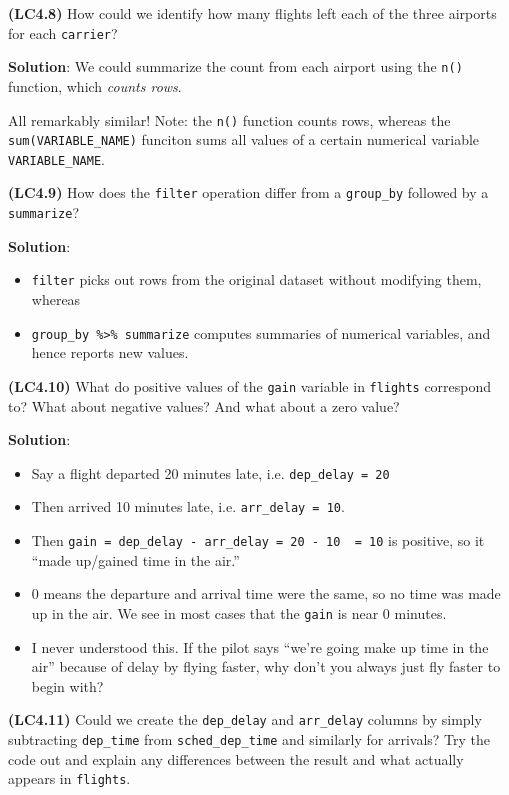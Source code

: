 \documentclass[12pt, krantz2,]{krantz}
\providecommand{\tightlist}{%
  \setlength{\itemsep}{0pt}\setlength{\parskip}{0pt}}
\begin{document}
\textbf{(LC4.8)} How could we identify how many flights left each of the three airports for each \texttt{carrier}?

\textbf{Solution}: We could summarize the count from each airport using the \texttt{n()} function, which \emph{counts rows}.

All remarkably similar! Note: the \texttt{n()} function counts rows, whereas the \texttt{sum(VARIABLE\_NAME)} funciton sums all values of a certain numerical variable \texttt{VARIABLE\_NAME}.

\textbf{(LC4.9)} How does the \texttt{filter} operation differ from a \texttt{group\_by} followed by a \texttt{summarize}?

\textbf{Solution}:

\begin{itemize}
\tightlist
\item
  \texttt{filter} picks out rows from the original dataset without modifying them, whereas
\item
  \texttt{group\_by\ \%\textgreater{}\%\ summarize} computes summaries of numerical variables, and hence
  reports new values.
\end{itemize}

\textbf{(LC4.10)} What do positive values of the \texttt{gain} variable in \texttt{flights} correspond to? What about negative values? And what about a zero value?

\textbf{Solution}:

\begin{itemize}
\tightlist
\item
  Say a flight departed 20 minutes late, i.e. \texttt{dep\_delay\ =\ 20}
\item
  Then arrived 10 minutes late, i.e. \texttt{arr\_delay\ =\ 10}.
\item
  Then \texttt{gain\ =\ dep\_delay\ -\ arr\_delay\ =\ 20\ -\ 10\ \ =\ 10} is positive, so it ``made up/gained time in the air.''
\item
  0 means the departure and arrival time were the same, so no time was made up in the air. We see in most cases that the \texttt{gain} is near 0 minutes.
\item
  I never understood this. If the pilot says ``we're going make up time in the air''
  because of delay by flying faster, why don't you always just fly faster to begin
  with?
\end{itemize}

\textbf{(LC4.11)} Could we create the \texttt{dep\_delay} and \texttt{arr\_delay} columns by simply subtracting \texttt{dep\_time} from \texttt{sched\_dep\_time} and similarly for arrivals? Try the code out and explain any differences between the result and what actually appears in \texttt{flights}.
\end{document}
